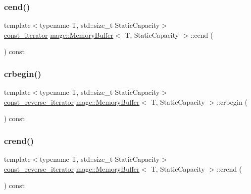 \mbox{\label{classmage_1_1_memory_buffer_adb3af117a8b2b2ba0f100a718fe58a43}} 
\subsubsection{\texorpdfstring{cend()}{cend()}}
{\footnotesize\ttfamily template$<$typename T, std\+::size\+\_\+t Static\+Capacity$>$ \\
\mbox{\hyperlink{classmage_1_1_memory_buffer_a3cc14c15660c36d35195e1836db33ee7}{const\+\_\+iterator}} \mbox{\hyperlink{classmage_1_1_memory_buffer}{mage\+::\+Memory\+Buffer}}$<$ T, Static\+Capacity $>$\+::cend (\begin{DoxyParamCaption}{ }\end{DoxyParamCaption}) const\hspace{0.3cm}{\ttfamily [noexcept]}}

\mbox{\label{classmage_1_1_memory_buffer_acc10ff03abb4a12177d4a2e11920b7c1}} 
\subsubsection{\texorpdfstring{crbegin()}{crbegin()}}
{\footnotesize\ttfamily template$<$typename T, std\+::size\+\_\+t Static\+Capacity$>$ \\
\mbox{\hyperlink{classmage_1_1_memory_buffer_a95188e283a195d9aa2730deb6b1c1a79}{const\+\_\+reverse\+\_\+iterator}} \mbox{\hyperlink{classmage_1_1_memory_buffer}{mage\+::\+Memory\+Buffer}}$<$ T, Static\+Capacity $>$\+::crbegin (\begin{DoxyParamCaption}{ }\end{DoxyParamCaption}) const\hspace{0.3cm}{\ttfamily [noexcept]}}

\mbox{\label{classmage_1_1_memory_buffer_a77f62cb9f4a94ca60c709cf2b0566db5}} 
\subsubsection{\texorpdfstring{crend()}{crend()}}
{\footnotesize\ttfamily template$<$typename T, std\+::size\+\_\+t Static\+Capacity$>$ \\
\mbox{\hyperlink{classmage_1_1_memory_buffer_a95188e283a195d9aa2730deb6b1c1a79}{const\+\_\+reverse\+\_\+iterator}} \mbox{\hyperlink{classmage_1_1_memory_buffer}{mage\+::\+Memory\+Buffer}}$<$ T, Static\+Capacity $>$\+::crend (\begin{DoxyParamCaption}{ }\end{DoxyParamCaption}) const\hspace{0.3cm}{\ttfamily [noexcept]}}

